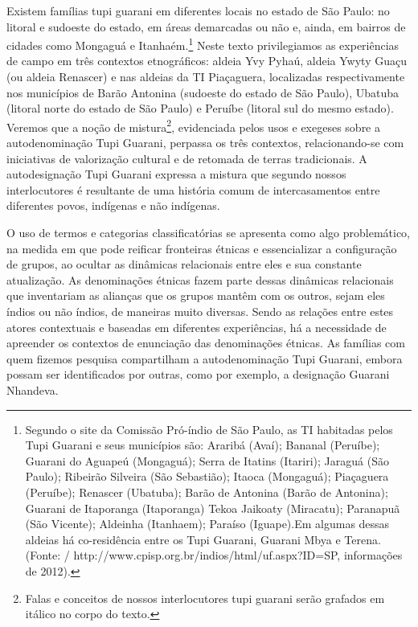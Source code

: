 \documentclass{article}
\begin{document}
Existem fam\'ilias tupi guarani em diferentes locais no estado de S\~ao
Paulo: no litoral e sudoeste do estado, em \'areas demarcadas ou n\~ao
e, ainda, em bairros de cidades como Mongagu\'a e Itanha\'em.\footnote{
Segundo o site da Comiss\~ao Pr\'o-\'indio de S\~ao Paulo, as TI
habitadas pelos Tupi Guarani e seus munic\'ipios s\~ao: Ararib\'a
(Ava\'i); Bananal (Peru\'ibe); Guarani do Aguape\'u (Mongagu\'a); Serra
de Itatins (Itariri); Jaragu\'a (S\~ao Paulo); Ribeir\~ao Silveira
(S\~ao Sebasti\~ao); Itaoca (Mongagu\'a); Pia\c{c}aguera (Peru\'ibe);
Renascer (Ubatuba); Bar\~ao de Antonina (Bar\~ao de Antonina); Guarani
de Itaporanga (Itaporanga) Tekoa Jaikoaty (Miracatu); Paranapu\~a
(S\~ao Vicente); Aldeinha (Itanhaem); Para\'iso (Iguape).Em algumas
dessas aldeias h\'a co-resid\^encia entre os Tupi Guarani, Guarani Mbya
e Terena. (Fonte: / http://www.cpisp.org.br/indios/html/uf.aspx?ID=SP,
informa\c{c}\~oes de 2012).} Neste texto privilegiamos as
experi\^encias de campo em tr\^es contextos etnogr\'aficos: aldeia Yvy
Pyha\'u, aldeia Ywyty Gua\c{c}u (ou aldeia Renascer) e nas aldeias da
TI Pia\c{c}aguera, localizadas respectivamente nos munic\'ipios de
Bar\~ao Antonina (sudoeste do estado de S\~ao Paulo), Ubatuba (litoral
norte do estado de S\~ao Paulo) e Peru\'ibe (litoral sul do mesmo
estado). Veremos que a no\c{c}\~ao de mistura\footnote{ Falas e
conceitos de nossos interlocutores tupi guarani ser\~ao grafados em
it\'alico no corpo do texto.}, evidenciada pelos usos e exegeses sobre
a autodenomina\c{c}\~ao Tupi Guarani, perpassa os tr\^es contextos,
relacionando-se com iniciativas de valoriza\c{c}\~ao cultural e de
retomada de terras tradicionais. A autodesigna\c{c}\~ao Tupi Guarani
expressa a mistura que segundo nossos interlocutores \'e resultante de
uma hist\'oria comum de intercasamentos entre diferentes povos,
ind\'igenas e n\~ao ind\'igenas. 

O uso de termos e categorias classificat\'orias se apresenta como algo
problem\'atico, na medida em que pode reificar fronteiras \'etnicas e
essencializar a configura\c{c}\~ao de grupos, ao ocultar as din\^amicas
relacionais entre eles e sua constante atualiza\c{c}\~ao. As
denomina\c{c}\~oes \'etnicas fazem parte dessas din\^amicas relacionais
que inventariam as alian\c{c}as que os grupos mant\^em com os outros,
sejam eles \'indios ou n\~ao \'indios, de maneiras muito diversas.
Sendo as rela\c{c}\~oes entre estes atores contextuais e baseadas em
diferentes experi\^encias, h\'a a necessidade de apreender os contextos
de enuncia\c{c}\~ao das denomina\c{c}\~oes \'etnicas. As fam\'ilias com
quem fizemos pesquisa compartilham a autodenomina\c{c}\~ao Tupi
Guarani, embora possam ser identificados por outras, como por exemplo,
a designa\c{c}\~ao Guarani Nhandeva.
\end{document}
